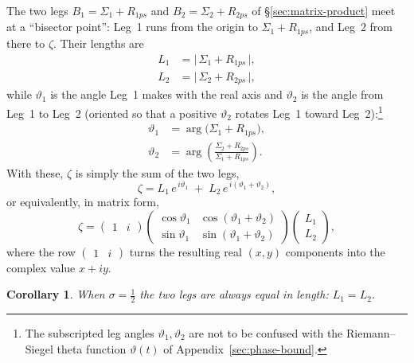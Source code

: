 \documentclass[11pt]{article}
\newtheorem{corollary}[theorem]{Corollary}
\theoremstyle{definition}
\begin{document}
The two legs $B_1=\Sigma_1+R_{1ps}$ and $B_2=\Sigma_2+R_{2ps}$ of
\S\ref{sec:matrix-product} meet at a ``bisector point'': Leg~1 runs from the
origin to $\Sigma_1+R_{1ps}$, and Leg~2 from there to $\zeta$. Their lengths are
\begin{align}
L_{1} &= \bigl|\,\Sigma_{1}+R_{1ps}\,\bigr|,\\
L_{2} &= \bigl|\,\Sigma_{2}+R_{2ps}\,\bigr|,
\end{align}
while $\vartheta_1$ is the angle Leg~1 makes with the real axis and $\vartheta_2$
is the angle from Leg~1 to Leg~2 (oriented so that a positive $\vartheta_2$
rotates Leg~1 toward Leg~2):\footnote{The subscripted leg angles
$\vartheta_1,\vartheta_2$ are not to be confused with the Riemann--Siegel
theta function $\vartheta(t)$ of Appendix~\ref{sec:phase-bound}.}
\begin{align}
\vartheta_{1} &= \arg\!\bigl(\Sigma_{1}+R_{1ps}\bigr),\\[2pt]
\vartheta_{2} &= \arg\!\left(\frac{\Sigma_{2}+R_{2ps}}{\Sigma_{1}+R_{1ps}}\right).
\end{align}
With these, $\zeta$ is simply the sum of the two legs,
\begin{equation}\label{eq:zeta-legs-polar}
\zeta
= L_{1}\,e^{\,i\vartheta_{1}}
\;+\;
L_{2}\,e^{\,i(\vartheta_{1}+\vartheta_{2})},
\end{equation}
or equivalently, in matrix form,
\begin{equation}\label{eq:zeta-matrix}
\zeta
=
\begin{pmatrix}1 & i\end{pmatrix}
\begin{pmatrix}
\cos\vartheta_{1} & \cos(\vartheta_{1}+\vartheta_{2})\\[2pt]
\sin\vartheta_{1} & \sin(\vartheta_{1}+\vartheta_{2})
\end{pmatrix}
\begin{pmatrix}
L_{1}\\[2pt]
L_{2}
\end{pmatrix},
\end{equation}
where the row $\begin{pmatrix}1 & i\end{pmatrix}$ turns the resulting real
$(x,y)$ components into the complex value $x+iy$.

\begin{corollary}\label{cor:equal-legs}
When $\sigma=\tfrac12$ the two legs are always equal in length: $L_1=L_2$.
\end{corollary}
\end{document}
